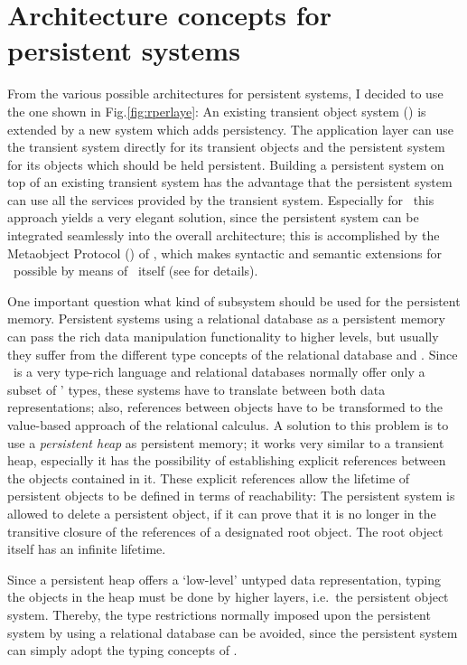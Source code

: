 \documentclass[a4paper%
]{article}
\newcommand\showfigrule{0pt}
\renewcommand\figurename{Fig.}
\begin{document}
\section{Architecture concepts for persistent systems}
%
\begin{figwindow}[2,r,{\rule{\showfigrule}{7\baselineskip}%
                       \psfig{figure=rperlaye.eps}},%
                 {Persistent system architecture%
                  \label{fig:rperlaye}}]
%
\noindent%
From the various possible architectures for persistent systems, I
decided to use the one shown in \figurename{\ref{fig:rperlaye}}:
An existing transient object system (\clos) is extended by a new
system which adds persistency. The application layer can use the
transient system directly for its transient objects and the persistent
system for its objects which should be held persistent. Building a
persistent system on top of an existing transient system has the
advantage that the persistent system can use all the services
provided by the transient system. Especially for \clos\ this approach
yields a very elegant solution, since the persistent system can be
integrated seamlessly into the overall architecture; this is
accomplished by the Metaobject Protocol (\mop) of \clos, which makes
syntactic and semantic extensions for \clos\ possible by means
of \clos\ itself (see \cite{bib:amop91,bib:st90} for details).
\end{figwindow}%
%
\par{}One important question what kind of subsystem should be used
for the persistent memory. Persistent systems using a relational
database as a persistent memory can pass the rich data manipulation
functionality to higher levels, but usually they suffer from the
different type concepts of the relational database and \clos.  Since
\clos\ is a very type-rich language and relational databases
normally offer only a subset of \clos' types, these systems have to
translate between both data representations; also, references between
objects have to be transformed to the value-based approach of the
relational calculus. A solution to this problem is to use a
\emph{persistent heap} as persistent memory; it works very similar to
a transient heap, especially it has the possibility of establishing
explicit references between the objects contained in it. These
explicit references allow the lifetime of persistent objects to be
defined in terms of reachability: The persistent system is allowed to
delete a persistent object, if it can prove that it is no longer in
the transitive closure of the references of a designated root
object. The root object itself has an infinite lifetime.
%
\par{}Since a persistent heap offers a `low-level' untyped data
representation, typing the objects in the heap must be done by higher
layers, i.e.\ the persistent object system. Thereby, the type
restrictions normally imposed upon the persistent system by using a
relational database can be avoided, since the persistent system can
simply adopt the typing concepts of \clos.
%
\end{document}
